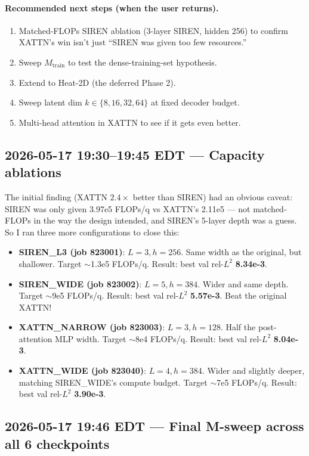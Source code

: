 \documentclass[11pt]{article}
\begin{document}
\paragraph{Recommended next steps (when the user returns).}
\begin{enumerate}
\item Matched-FLOPs SIREN ablation (3-layer SIREN, hidden 256) to confirm
      XATTN's win isn't just ``SIREN was given too few resources.''
\item Sweep $M_{\text{train}}$ to test the dense-training-set hypothesis.
\item Extend to Heat-2D (the deferred Phase 2).
\item Sweep latent dim $k \in \{8, 16, 32, 64\}$ at fixed decoder budget.
\item Multi-head attention in XATTN to see if it gets even better.
\end{enumerate}

\subsection*{2026-05-17 19:30--19:45 EDT --- Capacity ablations}
The initial finding (XATTN $2.4\times$ better than SIREN) had an obvious
caveat: SIREN was only given 3.97e5 FLOPs/q vs XATTN's 2.11e5 --- not
matched-FLOPs in the way the design intended, and SIREN's 5-layer depth
was a guess. So I ran three more configurations to close this:
\begin{itemize}
\item \textbf{SIREN\_L3 (job 823001)}: $L=3, h=256$. Same width as the
      original, but shallower. Target $\sim$1.3e5 FLOPs/q. Result: best
      val rel-$L^2$ \textbf{8.34e-3}.
\item \textbf{SIREN\_WIDE (job 823002)}: $L=5, h=384$. Wider and same
      depth. Target $\sim$9e5 FLOPs/q. Result: best val rel-$L^2$
      \textbf{5.57e-3}. Beat the original XATTN!
\item \textbf{XATTN\_NARROW (job 823003)}: $L=3, h=128$. Half the
      post-attention MLP width. Target $\sim$8e4 FLOPs/q. Result: best
      val rel-$L^2$ \textbf{8.04e-3}.
\item \textbf{XATTN\_WIDE (job 823040)}: $L=4, h=384$. Wider and
      slightly deeper, matching SIREN\_WIDE's compute budget. Target
      $\sim$7e5 FLOPs/q. Result: best val rel-$L^2$ \textbf{3.90e-3}.
\end{itemize}

\subsection*{2026-05-17 19:46 EDT --- Final M-sweep across all 6 checkpoints}
\end{document}
